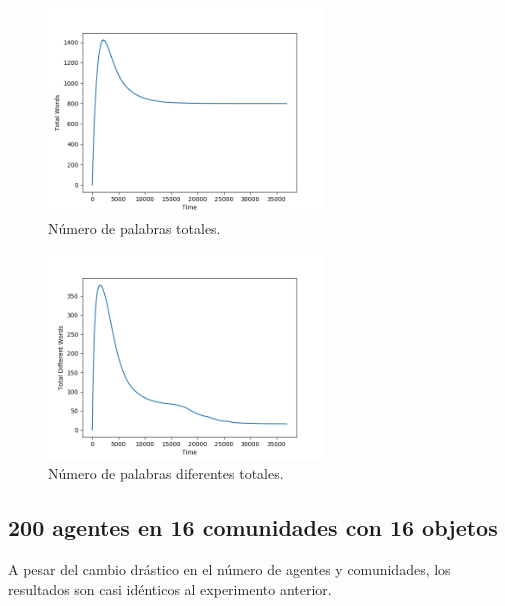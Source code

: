 \documentclass[runningheads]{llncs}
\begin{document}
\begin{figure}[H]
	\centering
	\includegraphics[width=0.65\textwidth]{Figure_311_TotalWords.png}
	\caption{Número de palabras totales.}
	\label{fig_004}
\end{figure}
\begin{figure}[H]
	\centering
	\includegraphics[width=0.65\textwidth]{Figure_311_TotalDifferentWords.png}
	\caption{Número de palabras diferentes totales.}
	\label{fig_005}
\end{figure}
\pagebreak
\subsection{200 agentes en 16 comunidades con 16 objetos}

A pesar del cambio drástico en el número de agentes y comunidades, los resultados son casi idénticos al experimento anterior. 
\end{document}
